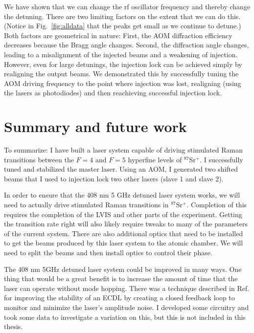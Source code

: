 

We have shown that we can change the rf oscillator frequency and thereby change the detuning. There are two limiting factors on the extent that we can do this. (Notice in Fig.\ \ref{fig:alldata} that the peaks get small as we continue to detune.) Both factors are geometrical in nature: First, the AOM diffraction efficiency decreases because the Bragg angle changes. Second, the diffraction angle changes, leading to a misalignment of the injected beams and a weakening of injection. However, even for large detunings, the injection lock can be achieved simply by realigning the output beams. We demonstrated this by successfully tuning the AOM driving frequency to the point where injection was lost, realigning (using the lasers as photodiodes) and then reachieving successful injection lock.

\section{Summary and future work}
To summarize: I have built a laser system capable of driving stimulated Raman transitions between the $F=4$ and $F=5$ hyperfine levels of $^{87}$Sr$^+$. I successfully tuned and stabilized the master laser. Using an AOM, I generated two shifted beams that I used to injection lock two other lasers (slave 1 and slave 2).

In order to ensure that the 408 nm 5 GHz detuned laser system works, we will need to actually drive stimulated Raman transitions in $^{87}$Sr$^+$. Completion of this requires the completion of the LVIS and other parts of the experiment. Getting the transition rate right will also likely require tweaks to many of the parameters of the current system. There are also additional optics that need to be installed to get the beams produced by this laser system to the atomic chamber. We will need to split the beams and then install optics to control their phase. 

The 408 nm 5GHz detuned laser system could be improved in many ways. One thing that would be a great benefit is to increase the amount of time that the laser can operate without mode hopping. There was a technique described in Ref.\,\cite{chiowChuLock} for improving the stability of an ECDL by creating a closed feedback loop to monitor and minimize the laser's amplitude noise. I developed some circuitry and took some data to investigate a variation on this, but this is not included in this thesis. 


